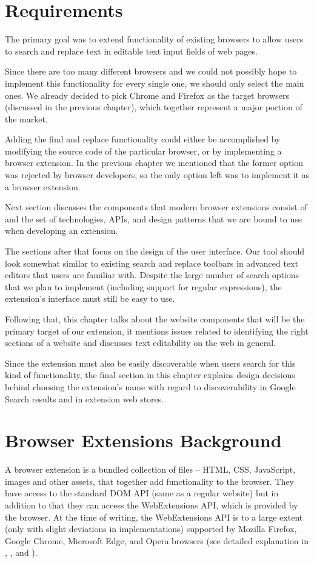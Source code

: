\documentclass[bsc,frontabs,twoside,singlespacing,parskip,deptreport]{infthesis}
\begin{document}
\section{Requirements}
The primary goal was to extend functionality of existing browsers to allow users to search and replace text in editable text input fields of web pages.

Since there are too many different browsers and we could not possibly hope to implement this functionality for every single one, we should only select the main ones. We already decided to pick Chrome and Firefox as the target browsers (discussed in the previous chapter), which together represent a major portion of the market.

Adding the find and replace functionality could either be accomplished by modifying the source code of the particular browser, or by implementing a browser extension. In the previous chapter we mentioned that the former option was rejected by browser developers, so the only option left was to implement it as a browser extension.

Next section discusses the components that modern browser extensions consist of and the set of technologies, APIs, and design patterns that we are bound to use when developing an extension.

The sections after that focus on the design of the user interface. Our tool should look somewhat similar to existing search and replace toolbars in advanced text editors that users are familiar with. Despite the large number of search options that we plan to implement (including support for regular expressions), the extension's interface must still be easy to use.

Following that, this chapter talks about the website components that will be the primary target of our extension, it mentions issues related to identifying the right sections of a website and discusses text editability on the web in general.

Since the extension must also be easily discoverable when users search for this kind of functionality, the final section in this chapter explains design decisions behind choosing the extension's name with regard to discoverability in Google Search results and in extension web stores.

\section{Browser Extensions Background}
A browser extension is a bundled collection of files -- HTML, CSS, JavaScript, images and other assets, that together add functionality to the browser. They have access to the standard DOM API (same as a regular website) but in addition to that they can access the WebExtensions API, which is provided by the browser. At the time of writing, the WebExtensions API is to a large extent (only with slight deviations in implementations) supported by Mozilla Firefox, Google Chrome, Microsoft Edge, and Opera browsers (see detailed explanation in \cite{C1}, \cite{C2}, \cite{M6} and \cite{M7}).
\end{document}
